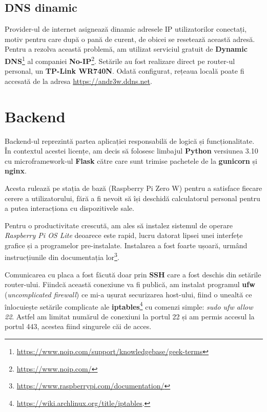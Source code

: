 \subsection{DNS dinamic}

Provider-ul de internet asignează dinamic adresele IP utilizatorilor conectați, motiv pentru care după o pană de curent, de obicei se resetează această adresă. Pentru a rezolva această problemă, am utilizat serviciul gratuit de \textbf{Dynamic DNS}\footnote{\url{https://www.noip.com/support/knowledgebase/geek-terms}} al companiei \textbf{No-IP}\footnote{\url{https://www.noip.com/}}. Setările au fost realizare direct pe router-ul personal, un \textbf{TP-Link WR740N}. Odată configurat, rețeaua locală poate fi accesată de la adresa \url{https://andr3w.ddns.net}.

\section{Backend}

Backend-ul reprezintă partea aplicației responsabilă de logică și funcționalitate. În contextul acestei licențe, am decis să folosesc limbajul \textbf{Python} versiunea 3.10 cu microframework-ul \textbf{Flask} către care sunt trimise pachetele de la \textbf{gunicorn} și \textbf{nginx}.

Acesta rulează pe stația de bază (Raspberry Pi Zero W) pentru a satisface fiecare cerere a utilizatorului, fără a fi nevoit să își deschidă calculatorul personal pentru a putea interacționa cu dispozitivele sale. 

Pentru o productivitate crescută, am ales să instalez sistemul de operare \emph{Raspberry Pi OS Lite} deoarece este rapid, lucru datorat lipsei unei interfețe grafice și a programelor pre-instalate. Instalarea a fost foarte ușoară, urmând instrucțiunile din documentația lor\footnote{\url{https://www.raspberrypi.com/documentation/}}.

Comunicarea cu placa a fost făcută doar prin \textbf{SSH} care a fost deschis din setările router-ului. Fiindcă această conexiune va fi publică, am instalat programul \textbf{ufw} (\emph{uncomplicated firewall}) ce mi-a ușurat securizarea host-ului, fiind o unealtă ce înlocuiește setările complicate ale \textbf{iptables}\footnote{\url{https://wiki.archlinux.org/title/iptables}.} cu comenzi simple: \emph{sudo ufw allow 22}. Astfel am limitat numărul de conexiuni la portul 22 și am permis accesul la portul 443, acestea fiind singurele  căi de acces.

